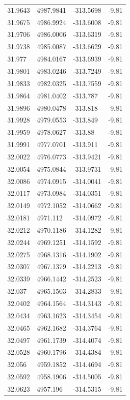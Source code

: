 \begin{table}[H]
\begin{tabular}{llll}
31.9643 & 4987.9841 & -313.5698 & -9.81 \\
31.9675 & 4986.9924 & -313.6008 & -9.81 \\
31.9706 & 4986.0006 & -313.6319 & -9.81 \\
31.9738 & 4985.0087 & -313.6629 & -9.81 \\
31.977 & 4984.0167 & -313.6939 & -9.81 \\
31.9801 & 4983.0246 & -313.7249 & -9.81 \\
31.9833 & 4982.0325 & -313.7559 & -9.81 \\
31.9864 & 4981.0402 & -313.787 & -9.81 \\
31.9896 & 4980.0478 & -313.818 & -9.81 \\
31.9928 & 4979.0553 & -313.849 & -9.81 \\
31.9959 & 4978.0627 & -313.88 & -9.81 \\
31.9991 & 4977.0701 & -313.911 & -9.81 \\
32.0022 & 4976.0773 & -313.9421 & -9.81 \\
32.0054 & 4975.0844 & -313.9731 & -9.81 \\
32.0086 & 4974.0915 & -314.0041 & -9.81 \\
32.0117 & 4973.0984 & -314.0351 & -9.81 \\
32.0149 & 4972.1052 & -314.0662 & -9.81 \\
32.0181 & 4971.112 & -314.0972 & -9.81 \\
32.0212 & 4970.1186 & -314.1282 & -9.81 \\
32.0244 & 4969.1251 & -314.1592 & -9.81 \\
32.0275 & 4968.1316 & -314.1902 & -9.81 \\
32.0307 & 4967.1379 & -314.2213 & -9.81 \\
32.0339 & 4966.1442 & -314.2523 & -9.81 \\
32.037 & 4965.1503 & -314.2833 & -9.81 \\
32.0402 & 4964.1564 & -314.3143 & -9.81 \\
32.0434 & 4963.1623 & -314.3454 & -9.81 \\
32.0465 & 4962.1682 & -314.3764 & -9.81 \\
32.0497 & 4961.1739 & -314.4074 & -9.81 \\
32.0528 & 4960.1796 & -314.4384 & -9.81 \\
32.056 & 4959.1852 & -314.4694 & -9.81 \\
32.0592 & 4958.1906 & -314.5005 & -9.81 \\
32.0623 & 4957.196 & -314.5315 & -9.81 \\

\end{tabular}
\end{table}
